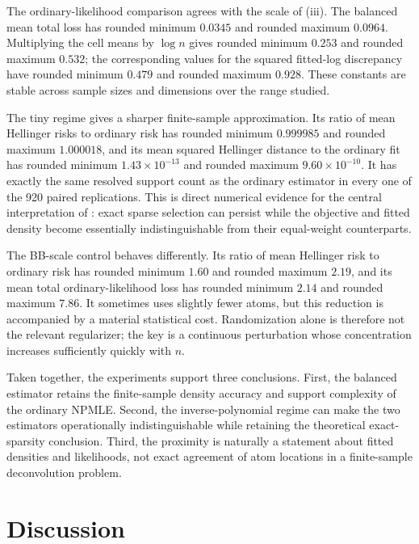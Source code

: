 \documentclass[11pt]{article}
\theoremstyle{definition}
\theoremstyle{remark}
\begin{document}
The ordinary-likelihood comparison agrees with the scale of
(iii).  The balanced mean total loss has rounded minimum
$0.0345$ and rounded maximum $0.0964$.  Multiplying the cell means by $\log n$
gives rounded minimum $0.253$ and rounded maximum $0.532$; the corresponding
values for the squared fitted-log discrepancy have rounded minimum $0.479$
and rounded maximum $0.928$.  These constants are stable across sample sizes
and dimensions over the range studied.

The tiny regime gives a sharper finite-sample approximation.  Its ratio of
mean Hellinger risks to ordinary risk has rounded minimum $0.999985$ and
rounded maximum $1.000018$, and its mean squared Hellinger distance to the
ordinary fit has rounded minimum $1.43\times10^{-13}$ and rounded maximum
$9.60\times10^{-10}$.  It has exactly the same
resolved support count as the ordinary estimator in every one of the 920
paired replications.  This is direct numerical evidence for the central
interpretation of : exact sparse selection can persist while
the objective and fitted density become essentially indistinguishable from
their equal-weight counterparts.

The BB-scale control behaves differently.  Its ratio of mean Hellinger risk
to ordinary risk has rounded minimum $1.60$ and rounded maximum $2.19$, and
its mean total ordinary-likelihood loss has rounded minimum $2.14$ and
rounded maximum $7.86$.  It sometimes uses slightly
fewer atoms, but this reduction is accompanied by a material statistical
cost.  Randomization alone is therefore not the relevant regularizer; the
key is a continuous perturbation whose concentration increases sufficiently
quickly with $n$.

Taken together, the experiments support three conclusions.  First, the
balanced estimator retains the finite-sample density accuracy and support
complexity of the ordinary NPMLE.  Second, the inverse-polynomial regime can
make the two estimators operationally indistinguishable while retaining the
theoretical exact-sparsity conclusion.  Third, the proximity is naturally a
statement about fitted densities and likelihoods, not exact agreement of atom
locations in a finite-sample deconvolution problem.

\section{Discussion}\label{sec:discussion}
\end{document}
